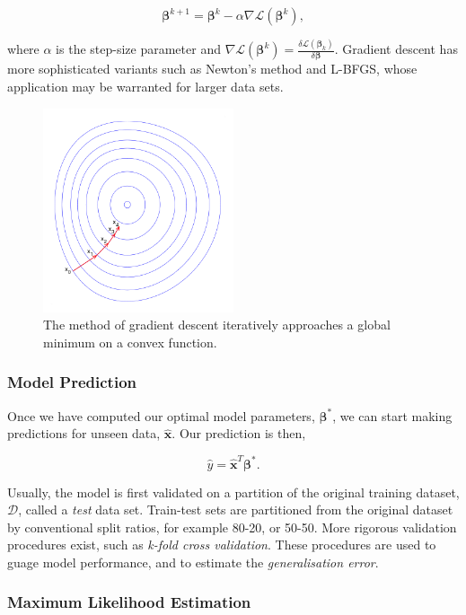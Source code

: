 \documentclass[11pt]{amsart}
\begin{document}
$$\boldsymbol\beta^{k+1} = \boldsymbol\beta^{k} - \alpha \nabla\mathcal{L}(\boldsymbol\beta^k),$$

where $\alpha$ is the step-size parameter and $\nabla\mathcal{L}(\boldsymbol\beta^k) = \frac{\delta\mathcal{L}(\boldsymbol\beta_k)}{\delta\boldsymbol\beta}$. Gradient descent has more sophisticated variants such as Newton's method and L-BFGS, whose application may be warranted for larger data sets.

\begin{figure}[!ht]
\centering
\includegraphics[width=0.5\textwidth]{Figures/gradientdescent.png}
\caption{The method of gradient descent iteratively approaches a global minimum on a convex function.\cite{gradientdescent}}
\label{fig:gradientdescent}
\end{figure}

\subsubsection{Model Prediction}

Once we have computed our optimal model parameters, $\boldsymbol\beta^*$, we can start making predictions for unseen data, $\hat{\mathbf{x}}$. Our prediction is then,

$$\hat{y} = \hat{\mathbf{x}}^T\boldsymbol\beta^*.$$

Usually, the model is first validated on a partition of the original training dataset, $\mathcal{D}$, called a \emph{test} data set. Train-test sets are partitioned from the original dataset by conventional split ratios, for example 80-20, or 50-50. More rigorous validation procedures exist, such as \emph{k-fold cross validation}. These procedures are used to guage model performance, and to estimate the \emph{generalisation error}.

\subsubsection{Maximum Likelihood Estimation}
\end{document}
